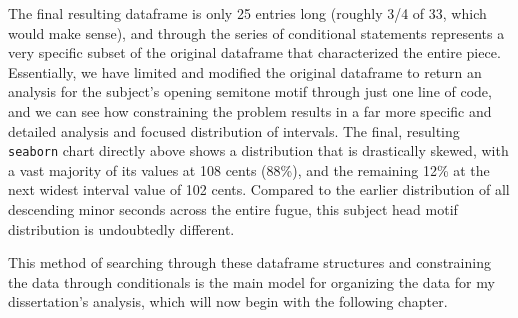     The final resulting dataframe is only 25 entries long (roughly 3/4 of
33, which would make sense), and through the series of conditional
statements represents a very specific subset of the original dataframe
that characterized the entire piece. Essentially, we have limited and
modified the original dataframe to return an analysis for the subject's
opening semitone motif through just one line of code, and we can see how
constraining the problem results in a far more specific and detailed
analysis and focused distribution of intervals. The final, resulting
\texttt{seaborn} chart directly above shows a distribution that is
drastically skewed, with a vast majority of its values at 108 cents
(88\%), and the remaining 12\% at the next widest interval value of 102
cents. Compared to the earlier distribution of all descending minor
seconds across the entire fugue, this subject head motif distribution is
undoubtedly different.

This method of searching through these dataframe structures and
constraining the data through conditionals is the main model for
organizing the data for my dissertation's analysis, which will now begin
with the following chapter.


    
    
    

